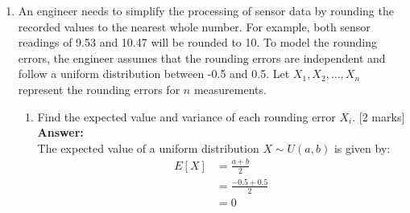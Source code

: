 \documentclass[12pt]{article}
\begin{document}
\begin{enumerate}
\begin{enumerate}
\item{\bf (*STAT7003)} 
Suppose the test is repeated independently $N$ times. Let $N_A$ be the number of times machine A completes the task before machine B. What is the distribution of $N_A$? What is the probability that machine A is faster than machine B in more than half of the $N$ trials?
			\\\phantom{1}\hfill [10 marks]
%
\\
\textbf{Answer:}
\\
The number of times machine A completes the task before machine B in $N$ trials is given by the expression:

\begin{align*}
N_A &= \sum_{i=1}^{N} I_i \\
I_i &= \begin{cases}
1 & \text{if machine A is faster than machine B in trial } i \\
0 & \text{otherwise}
\end{cases}
\end{align*}

Therefore, $N_A$ is the sum of $N$ independent Bernoulli random variables, where each $I_i$ has a success probability of $p$.
The distribution of $N_A$ is given by the binomial distribution with parameters $N$ and $p$:

\begin{align*}
N_A \sim \mathrm{Binomial}(N, p) \\
\end{align*}


\end{enumerate}

\vspace{5pt}
\item An engineer needs to simplify the processing of sensor data by rounding the recorded values to the nearest whole number. For example, both sensor readings of 9.53 and 10.47 will be rounded to 10. To model the rounding errors, the engineer assumes that the rounding errors are independent and follow a uniform distribution between -0.5 and 0.5. Let $X_1, X_2, \ldots, X_n$ represent the rounding errors for $n$ measurements.  

\begin{enumerate}
\item Find the expected value and variance of each rounding error $X_i$.
			\hfill [2 marks]
%
\\
\textbf{Answer:}
\\
The expected value of a uniform distribution $X \sim U(a, b)$ is given by:
\begin{align*}
E[X] &= \frac{a + b}{2} \\
&= \frac{-0.5 + 0.5}{2} \\
&= 0 \\
\end{align*}


\end{enumerate}
\end{enumerate}
\end{document}
